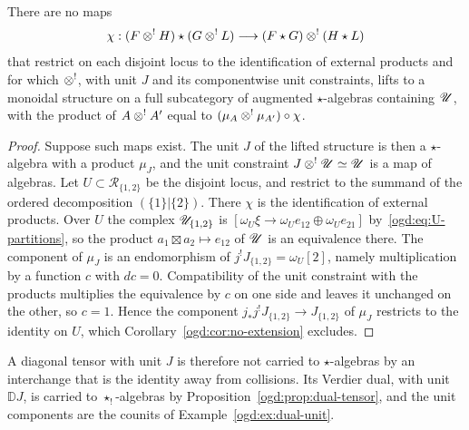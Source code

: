 \begin{proposition}\label{ogd:prop:no-interchange}
There are no maps
\[
 \chi:(F\mathbin{\otimes^!} H)\star(G\mathbin{\otimes^!} L)\longrightarrow(F\star G)\mathbin{\otimes^!}(H\star L)
\]
that restrict on each disjoint locus to the identification of external products and for which \(\mathbin{\otimes^!}\), with unit \(J\) and its componentwise unit constraints, lifts to a monoidal structure on a full subcategory of augmented \(\star\)-algebras containing \(\mathscr U\), with the product of \(A\mathbin{\otimes^!} A'\) equal to \((\mu_A\mathbin{\otimes^!}\mu_{A'})\circ\chi\).
\end{proposition}
\begin{proof}
Suppose such maps exist.
The unit \(J\) of the lifted structure is then a \(\star\)-algebra with a product \(\mu_J\), and the unit constraint \(J\mathbin{\otimes^!}\mathscr U\simeq\mathscr U\) is a map of algebras.
Let \(U\subset\mathscr R_{\{1,2\}}\) be the disjoint locus, and restrict to the summand of the ordered decomposition \((\{1\}|\{2\})\).
There \(\chi\) is the identification of external products.
Over \(U\) the complex \(\mathscr U_{\{1,2\}}\) is \([\omega_U\xi\to\omega_Ue_{12}\oplus\omega_Ue_{21}]\) by~\eqref{ogd:eq:U-partitions}, so the product \(a_1\boxtimes a_2\mapsto e_{12}\) of \(\mathscr U\) is an equivalence there.
The component of \(\mu_J\) is an endomorphism of \(j^!J_{\{1,2\}}=\omega_U[2]\), namely multiplication by a function \(c\) with \(dc=0\).
Compatibility of the unit constraint with the products multiplies the equivalence by \(c\) on one side and leaves it unchanged on the other, so \(c=1\).
Hence the component \(j_*j^!J_{\{1,2\}}\to J_{\{1,2\}}\) of \(\mu_J\) restricts to the identity on \(U\), which Corollary~\ref{ogd:cor:no-extension} excludes.
\end{proof}

A diagonal tensor with unit \(J\) is therefore not carried to \(\star\)-algebras by an interchange that is the identity away from collisions.
Its Verdier dual, with unit \(\mathbb DJ\), is carried to \(\star_!\)-algebras by Proposition~\ref{ogd:prop:dual-tensor}, and the unit components are the counits of Example~\ref{ogd:ex:dual-unit}.

